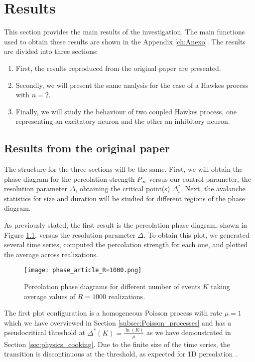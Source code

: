 \chapter{Results} \label{ch:resultados}

This section provides the main results of the investigation. The main functions used to obtain these results are shown in the Appendix \ref{ch:Anexo}. 
The results are divided into three sections:
\begin{enumerate}
    \item First, the results reproduced from the original paper \cite{notarmuzi2021percolation} are presented.
    \item Secondly, we will present the same analysis for the case of a Hawkes process with $n=2$.
    \item Finally, we will study the behaviour of two coupled Hawkes process, one representing an excitatory neuron and the other an inhibitory neuron.
\end{enumerate}

\section{Results from the original paper}

The structure for the three sections will be the same. First, we will obtain the phase diagram for the percolation strength $P_{\infty}$ versus our control parameter, the resolution parameter 
$\Delta$, obtaining the critical point(s) $\Delta^*_{i}$. Next, the avalanche statistics for size and duration will be studied for different regions 
of the phase diagram.  

As previously stated, the first result is the percolation phase diagram, shown in Figure \ref{f:phase_diagram_article}. 
versus the resolution parameter $\Delta$. To obtain this plot, we generated several time series, computed the percolation strength for each one, and plotted the average across realizations.

\begin{figure}[H]
    \centering
    \texttt{[image: phase\_article\_R=1000.png]}
    \caption{Percolation phase diagrams for different number of events $K$ taking average values of $R=1000$ realizations.}
    \label{f:phase_diagram_article}
\end{figure}

The first plot configuration is a homogeneous Poisson process with rate $\mu=1$ which we have overviewed in Section \ref{subsec:Poisson_processes} and has a pseudocritical threshold at 
$\Delta^*(K)=\frac{\ln(K)}{\mu}$ as we have demonstrated in Section \ref{sec:physics_cooking}. Due to the finite size of the time series, the transition is discontinuous at 
the threshold, as expected for 1D percolation \cite{stauffer2018introduction}.


